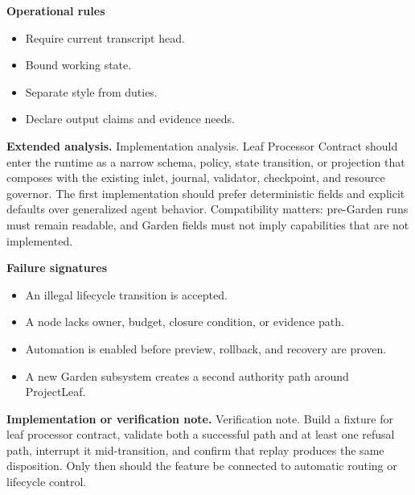 \documentclass[10pt,letterpaper,oneside]{article}
\begin{document}
\textbf{Operational rules}
\begin{itemize}
\item Require current transcript head.
\item Bound working state.
\item Separate style from duties.
\item Declare output claims and evidence needs.
\end{itemize}
\textbf{Extended analysis.} Implementation analysis. Leaf Processor Contract should enter the runtime as a narrow schema, policy, state transition, or projection that composes with the existing inlet, journal, validator, checkpoint, and resource governor. The first implementation should prefer deterministic fields and explicit defaults over generalized agent behavior. Compatibility matters: pre-Garden runs must remain readable, and Garden fields must not imply capabilities that are not implemented.

\textbf{Failure signatures}
\begin{itemize}
\item An illegal lifecycle transition is accepted.
\item A node lacks owner, budget, closure condition, or evidence path.
\item Automation is enabled before preview, rollback, and recovery are proven.
\item A new Garden subsystem creates a second authority path around ProjectLeaf.
\end{itemize}
\textbf{Implementation or verification note.} Verification note. Build a fixture for leaf processor contract, validate both a successful path and at least one refusal path, interrupt it mid-transition, and confirm that replay produces the same disposition. Only then should the feature be connected to automatic routing or lifecycle control.
\end{document}
